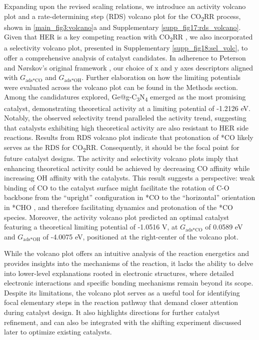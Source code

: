     Expanding upon the revised scaling relations, we introduce an activity volcano plot and a rate-determining step (RDS) volcano plot for the CO\textsubscript{2}RR process, shown in \cref{main_fig3:volcano}a and Supplementary \cref{supp_fig17:rds_volcano}.
    Given that HER is a key competing reaction with CO\textsubscript{2}RR \cite{goyal2020competition}, we also incorporated a selectivity volcano plot, presented in Supplementary \cref{supp_fig18:sel_volc}, to offer a comprehensive analysis of catalyst candidates.
    In adherence to Peterson and Nørskov's original framework \cite{peterson2012activity}, our choice of x and y axes descriptors aligned with $\textit{G}_{\text{ads} \ast \text{CO}}$ and $\textit{G}_{\text{ads} \ast \text{OH}}$.
    Further elaboration on how the limiting potentials were evaluated across the volcano plot can be found in the Methods section.
    Among the candidatures explored, Ge@g-C\textsubscript{3}N\textsubscript{4} emerged as the most promising catalyst, demonstrating theoretical activity at a limiting potential of -1.2126 eV.
    Notably, the observed selectivity trend paralleled the activity trend, suggesting that catalysts exhibiting high theoretical activity are also resistant to HER side reactions.
    Results from RDS volcano plot indicate that protonation of *CO likely serves as the RDS for CO\textsubscript{2}RR. Consequently, it should be the focal point for future catalyst designs.
    The activity and selectivity volcano plots imply that enhancing theoretical activity could be achieved by decreasing CO affinity while increasing OH affinity with the catalysts.
    This result suggests a perspective: weak binding of CO to the catalyst surface might facilitate the rotation of C-O backbone from the ``upright'' configuration in *CO to the ``horizontal'' orientation in *CHO \cite{peterson2010copper}, and therefore facilitating dynamics and protonation of the *CO species.
    Moreover, the activity volcano plot predicted an optimal catalyst featuring a theoretical limiting potential of -1.0516 V, at $\textit{G}_{\text{ads} \ast \text{CO}}$ of 0.0589 eV and $\textit{G}_{\text{ads} \ast \text{OH}}$ of -4.0075 eV, positioned at the right-center of the volcano plot.

    While the volcano plot offers an intuitive analysis of the reaction energetics and provides insights into the mechanisms of the reaction, it lacks the ability to delve into lower-level explanations rooted in electronic structures, where detailed electronic interactions and specific bonding mechanisms remain beyond its scope.
    Despite its limitations, the volcano plot serves as a useful tool for identifying focal elementary steps in the reaction pathway that demand closer attention during catalyst design.
    It also highlights directions for further catalyst refinement, and can also be integrated with the shifting experiment discussed later to optimize existing catalysts.

